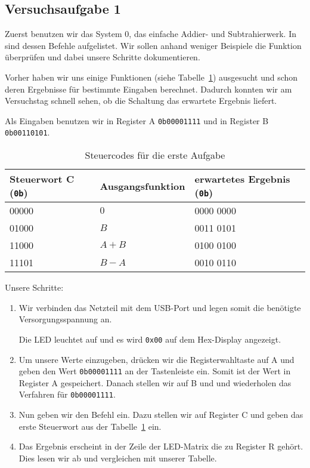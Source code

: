 \subsection{Versuchsaufgabe 1}

Zuerst benutzen wir das System 0, das einfache Addier- und Subtrahierwerk. In
\cite[Tabelle~8.1]{physik313-Anleitung} sind dessen Befehle aufgelistet. Wir
sollen anhand weniger Beispiele die Funktion überprüfen und dabei unsere
Schritte dokumentieren.

Vorher haben wir uns einige Funktionen (siehe Tabelle~\ref{tab:1}) ausgesucht
und schon deren Ergebnisse für bestimmte Eingaben berechnet. Dadurch konnten
wir am Versuchstag schnell sehen, ob die Schaltung das erwartete Ergebnis
liefert.

Als Eingaben benutzen wir in Register A \texttt{0b00001111} und in Register B
\texttt{0b00110101}.

\begin{table}[htbp]
	\centering
	\begin{tabular}{lll}
		Steuerwort C (\texttt{0b}) & Ausgangsfunktion & erwartetes Ergebnis
		(\texttt{0b}) \\
		\hline
		00000 & $0$ & 0000 0000 \\
		01000 & $B$ & 0011 0101 \\
		11000 & $A + B$ & 0100 0100 \\
		11101 & $B - A$ & 0010 0110
	\end{tabular}
	\caption{%
		Steuercodes für die erste Aufgabe
	}
	\label{tab:1}
\end{table}

Unsere Schritte:

\begin{enumerate}
	\item
		Wir verbinden das Netzteil mit dem USB-Port und legen somit die
		benötigte Versorgungsspannung an.

		Die LED leuchtet auf und es wird \texttt{0x00} auf dem Hex-Display
		angezeigt.

	\item
		Um unsere Werte einzugeben, drücken wir die Registerwahltaste auf A und
		geben den Wert \texttt{0b00001111} an der Tastenleiste ein. Somit ist
		der Wert in Register A gespeichert. Danach stellen wir auf B und und
		wiederholen das Verfahren für \texttt{0b00001111}.

	\item
		Nun geben wir den Befehl ein. Dazu stellen wir auf Register C und geben
		das erste Steuerwort aus der Tabelle~\ref{tab:1} ein.

	\item
		Das Ergebnis erscheint in der Zeile der LED-Matrix die zu Register R
		gehört. Dies lesen wir ab und vergleichen mit unserer Tabelle.
\end{enumerate}

